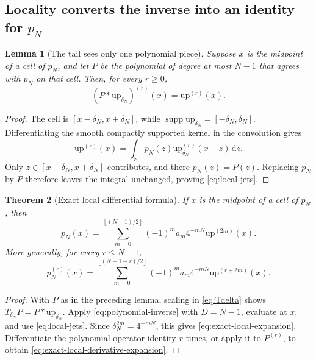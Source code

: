 \documentclass[11pt,oneside]{article}
\numberwithin{equation}{section}
\newtheorem{theorem}{Theorem}[section]
\newtheorem{lemma}[theorem]{Lemma}
\theoremstyle{definition}
\theoremstyle{remark}
\newcommand{\R}{\mathbb{R}}
\newcommand{\upf}{\mathrm{up}}
\newcommand{\dd}{\,\mathrm{d}}
\newcommand{\floor}[1]{\left\lfloor #1\right\rfloor}
\DeclareMathOperator{\supp}{supp}
\begin{document}
\subsection{Locality converts the inverse into an identity for \texorpdfstring{$p_N$}{pN}}

\begin{lemma}[The tail sees only one polynomial piece]
Suppose $x$ is the midpoint of a cell of $p_N$, and let $P$ be the polynomial of
degree at most $N-1$ that agrees with $p_N$ on that cell.  Then, for every
$r\ge0$,
\begin{equation}
 (P*\upf_{\delta_N})^{(r)}(x)=\upf^{(r)}(x).
 \label{eq:local-jets}
\end{equation}
\end{lemma}

\begin{proof}
The cell is $[x-\delta_N,x+\delta_N]$, while
$\supp\upf_{\delta_N}=[-\delta_N,\delta_N]$.  Differentiating the smooth compactly
supported kernel in the convolution gives
\[
 \upf^{(r)}(x)
 =\int_{\R}p_N(z)\upf_{\delta_N}^{(r)}(x-z)\dd z.
\]
Only $z\in[x-\delta_N,x+\delta_N]$ contributes, and there $p_N(z)=P(z)$.
Replacing $p_N$ by $P$ therefore leaves the integral unchanged, proving
\eqref{eq:local-jets}.
\end{proof}

\begin{theorem}[Exact local differential formula]
If $x$ is the midpoint of a cell of $p_N$, then
\begin{equation}
 \boxed{\displaystyle
 p_N(x)=\sum_{m=0}^{\floor{(N-1)/2}}
 (-1)^ma_m4^{-mN}\upf^{(2m)}(x).}
 \label{eq:exact-local-expansion}
\end{equation}
More generally, for every $r\le N-1$,
\begin{equation}
 p_N^{(r)}(x)=
 \sum_{m=0}^{\floor{(N-1-r)/2}}
 (-1)^ma_m4^{-mN}\upf^{(r+2m)}(x).
 \label{eq:exact-local-derivative-expansion}
\end{equation}
\end{theorem}

\begin{proof}
With $P$ as in the preceding lemma, scaling in \eqref{eq:Tdelta} shows
$T_{\delta_N}P=P*\upf_{\delta_N}$.  Apply
\eqref{eq:polynomial-inverse} with $D=N-1$, evaluate at $x$, and use
\eqref{eq:local-jets}.  Since $\delta_N^{2m}=4^{-mN}$, this gives
\eqref{eq:exact-local-expansion}.  Differentiate the polynomial operator identity
$r$ times, or apply it to $P^{(r)}$, to obtain
\eqref{eq:exact-local-derivative-expansion}.
\end{proof}
\end{document}

